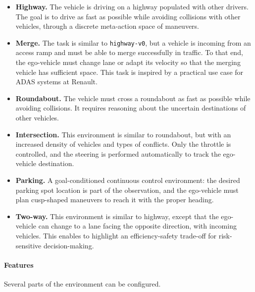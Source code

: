 \begin{itemize}
	\item \textbf{Highway.} The vehicle is driving on a highway populated with other drivers. The goal is to drive as fast as possible while avoiding collisions with other vehicles, through a discrete meta-action space of maneuvers.
	\item \textbf{Merge.} The task is similar to \texttt{highway-v0}, but a vehicle is incoming from an access ramp and must be able to merge successfully in traffic. To that end, the ego-vehicle must change lane or adapt its velocity so that the merging vehicle has sufficient space. This task is inspired by a practical use case for \gls{ADAS} systems at Renault.
	\item \textbf{Roundabout.} The vehicle must cross a roundabout as fast as possible while avoiding collisions. It requires reasoning about the uncertain destinations of other vehicles.
	\item \textbf{Intersection.} This environment is similar to roundabout, but with an increased density of vehicles and types of conflicts. Only the throttle is controlled, and the steering is performed automatically to track the ego-vehicle destination.
	\item \textbf{Parking.} A goal-conditioned continuous control environment: the desired parking spot location is part of the observation, and the ego-vehicle must plan cusp-shaped maneuvers to reach it with the proper heading.
	\item \textbf{Two-way.} This environment is similar to highway, except that the ego-vehicle can change to a lane facing the opposite direction, with incoming vehicles. This enables to highlight an efficiency-safety trade-off for risk-sensitive decision-making.
\end{itemize}

\paragraph{Features}

Several parts of the environment can be configured.

